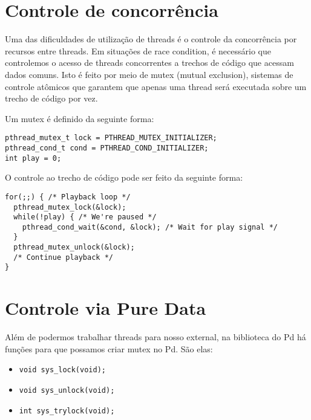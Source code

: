 \section{Controle de concorrência}

Uma das dificuldades de utilização de threads é o controle da concorrência por
recursos entre threads. Em situações de race condition, é necessário que
controlemos o acesso de threads concorrentes a trechos de código que acessam
dados comuns. Isto é feito por meio de mutex (mutual exclusion), sistemas de
controle atômicos que garantem que apenas uma thread será executada sobre um
trecho de código por vez.

Um mutex é definido da seguinte forma:

\begin{lstlisting}
pthread_mutex_t lock = PTHREAD_MUTEX_INITIALIZER;
pthread_cond_t cond = PTHREAD_COND_INITIALIZER;
int play = 0;
\end{lstlisting}

O controle ao trecho de código pode ser feito da seguinte forma:

\begin{lstlisting}
for(;;) { /* Playback loop */
  pthread_mutex_lock(&lock);
  while(!play) { /* We're paused */
    pthread_cond_wait(&cond, &lock); /* Wait for play signal */
  }
  pthread_mutex_unlock(&lock);
  /* Continue playback */
}
\end{lstlisting}


\section{Controle via Pure Data}
Além de podermos trabalhar threads para nosso external, na biblioteca do
Pd há funções para que possamos criar mutex no Pd. São elas:

\begin{itemize}
\item \texttt{void sys\_lock(void);}
\item \texttt{void sys\_unlock(void);}
\item \texttt{int sys\_trylock(void);}
\end{itemize}
